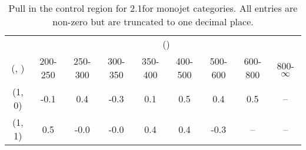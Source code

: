\begin{table}[h!]
\tiny
\centering
\caption{Pull in the \mj control region for 2.1\ifb for monojet categories. All entries are non-zero but are truncated to one decimal place.\label{tab:pullsepnaive_mu_ewk_mono}}
\begin{tabular}
{ccccccccc}
	\hline\hline
	& \multicolumn{8}{c}{\scalht (\gev)} \\ 
	 (\njet,  \nb) & 200-250 & 250-300 & 300-350 & 350-400 & 400-500 & 500-600 & 600-800 & 800-$\infty$ \\ [0.8ex] 
\hline
	(1, 0) & -0.1 & 0.4 & -0.3 & 0.1 & 0.5 & 0.4 & 0.5 & -- \\[0.5ex] 
	(1, 1) & 0.5 & -0.0 & -0.0 & 0.4 & 0.4 & -0.3 & -- & -- \\[0.5ex] 
	\hline
	\hline
\end{tabular}
\end{table}
